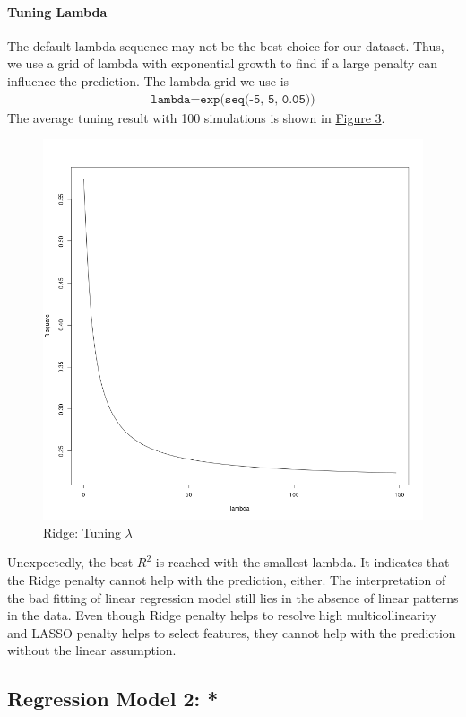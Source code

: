 \documentclass[8pt]{article}
\begin{document}
\paragraph{Tuning Lambda}
The default lambda sequence may not be the best choice for our dataset.
Thus, we use a grid of lambda with exponential growth to find 
if a large penalty can influence the prediction. The lambda grid we use is 
\begin{align*}
    \texttt{lambda} = \texttt{exp(seq(-5, 5, 0.05))}
\end{align*}
The average tuning result with 100 simulations is shown in \hyperref[fig:lambda]{Figure 3}.
\begin{figure}[H]
    \centering
    \includegraphics*[scale=0.25]{figures/lambda.png}
    \caption{Ridge: Tuning $\lambda$}
\label{fig:lambda}
\end{figure}
Unexpectedly, the best $R^2$ is reached with the smallest lambda. 
It indicates that the Ridge penalty cannot help with the prediction, either. 
The interpretation of the bad fitting of linear regression model still lies in the absence of linear patterns in the data.
Even though Ridge penalty helps to resolve high multicollinearity and LASSO penalty 
helps to select features, they cannot help with the prediction without the linear assumption.

\subsection{Regression Model 2: *}
\end{document}
